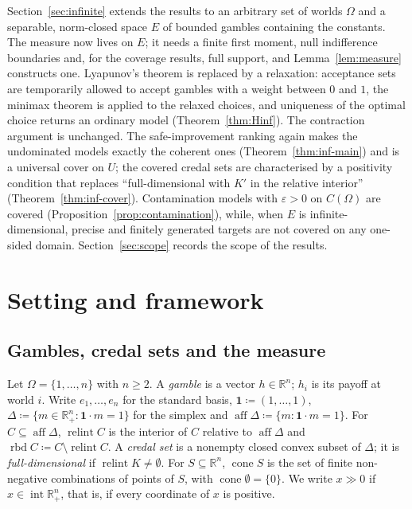 \documentclass[11pt]{article}
\newcommand{\R}{\mathbb{R}}
\newcommand{\one}{\mathbf{1}}
\newcommand{\Rp}{\R^n_{+}}
\newcommand{\Rpp}{\inter\R^n_{+}}
\DeclareMathOperator{\cone}{cone}
\DeclareMathOperator{\relint}{relint}
\DeclareMathOperator{\rbd}{rbd}
\DeclareMathOperator{\aff}{aff}
\DeclareMathOperator{\inter}{int}
\theoremstyle{plain}
\theoremstyle{definition}
\theoremstyle{remark}
\begin{document}
Section~\ref{sec:infinite} extends the results to an arbitrary set of worlds $\Omega$ and a
separable, norm-closed space $E$ of bounded gambles containing the constants. The measure
now lives on $E$; it needs a finite first moment, null indifference boundaries and, for
the coverage results, full support, and Lemma~\ref{lem:measure} constructs one. Lyapunov's theorem is replaced by a relaxation:
acceptance sets are temporarily allowed to accept gambles with a weight between $0$ and
$1$, the minimax theorem is applied to the relaxed choices, and uniqueness of the optimal
choice returns an ordinary model (Theorem~\ref{thm:Hinf}). The contraction argument is
unchanged. The safe-improvement ranking again makes the undominated models exactly the
coherent ones (Theorem~\ref{thm:inf-main}) and is a universal cover on $U$; the covered
credal sets are characterised by a positivity condition that replaces ``full-dimensional
with $K'$ in the relative interior'' (Theorem~\ref{thm:inf-cover}). Contamination models
with $\varepsilon>0$ on $C(\Omega)$ are covered (Proposition~\ref{prop:contamination}),
while, when $E$ is infinite-dimensional, precise and finitely generated targets are not
covered on any one-sided domain. Section~\ref{sec:scope} records the scope
of the results.

\section{Setting and framework}\label{sec:framework}

\subsection{Gambles, credal sets and the measure}

Let $\Omega=\{1,\dots,n\}$ with $n\ge2$. A \emph{gamble} is a vector $h\in\R^n$; $h_i$ is
its payoff at world $i$. Write $e_1,\dots,e_n$ for the standard basis, $\one\coloneqq
(1,\dots,1)$, $\Delta\coloneqq\{m\in\Rp:\one\cdot m=1\}$ for the simplex and
$\aff\Delta\coloneqq\{m:\one\cdot m=1\}$. For $C\subseteq\aff\Delta$, $\relint C$ is the interior
of $C$ relative to $\aff\Delta$ and $\rbd C\coloneqq C\setminus\relint C$. A
\emph{credal set} is a nonempty closed convex subset of $\Delta$; it is
\emph{full-dimensional} if $\relint K\neq\emptyset$. For $S\subseteq\R^n$, $\cone S$ is
the set of finite non-negative combinations of points of $S$, with $\cone\emptyset=\{0\}$.
We write $x\gg0$ if $x\in\Rpp$, that is, if every coordinate of $x$ is positive.
\end{document}
